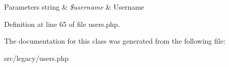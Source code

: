 \begin{DoxyParams}[1]{\-Parameters}
string & {\em \$username} & \-Username \\
\hline
\end{DoxyParams}


\-Definition at line 65 of file users.\-php.




\-The documentation for this class was generated from the following file\-:\begin{DoxyCompactItemize}
\item 
src/legacy/users.\-php\end{DoxyCompactItemize}
